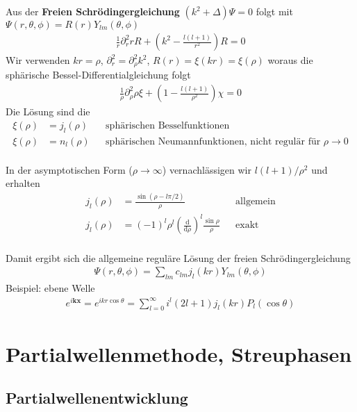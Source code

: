 \documentclass[11pt,a4paper]{report}
\begin{document}
Aus der \textbf{Freien Schrödingergleichung} $(k^2 + \Delta) \Psi = 0$ folgt mit $\Psi(r, \theta, \phi) = R(r) Y_{l m} (\theta, \phi)$
\begin{align*}
    \frac{1}{r} \partial_r^2 r R + \left(k^2 - \frac{l (l+1)}{r^2}\right) R = 0
\end{align*}
Wir verwenden $k r = \rho$, $\partial_r^2 = \partial_\rho^2 k^2$, $R(r) = \xi(kr) = \xi(\rho)$ woraus die sphärische Bessel-Differentialgleichung folgt
\begin{align*}
    \frac{1}{\rho} \partial_\rho^2 \rho \xi + \left(1 - \frac{l (l +1)}{\rho^2} \right) \chi = 0
\end{align*}
Die Lösung sind die 
\begin{align*}
    \xi(\rho) &= j_l(\rho) && \text{sphärischen Besselfunktionen} \\
    \xi(\rho) &= n_l(\rho) && \text{sphärischen Neumannfunktionen, nicht regulär für } \rho\rightarrow 0 \\
\end{align*}

In der asymptotischen Form ($\rho \rightarrow \infty$) vernachlässigen wir $l(l+1)/\rho^2$ und erhalten 
\begin{align*}
    j_l(\rho) &= \frac{\sin (\rho - l \pi/2)}{\rho} && \text{allgemein} \\
    j_l(\rho) &= (-1)^l \rho^l \left(\frac{\mathrm{d}}{\mathrm{d}\rho}\right)^l\frac{\sin \rho}{\rho} && \text{exakt} \\
\end{align*}

Damit ergibt sich die allgemeine reguläre Lösung der freien Schrödingergleichung
\begin{align*}
    \Psi(r, \theta, \phi) = \sum_{l m} c_{l m} j_l (k r) Y_{l m}(\theta, \phi)
\end{align*}
Beispiel: ebene Welle
\begin{align*}
    e^{i \mathbf{k} \mathbf{x}} = e^{i k r \cos \theta} = \sum_{l = 0}^\infty i^l (2l +1) j_l(k r) P_l (\cos \theta)
\end{align*}

\section{Partialwellenmethode, Streuphasen}

\subsection{Partialwellenentwicklung}
\end{document}
